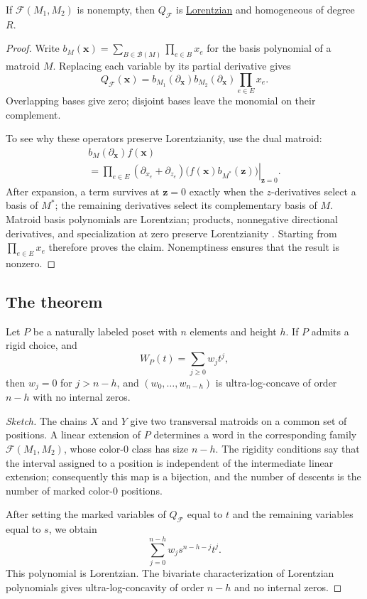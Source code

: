 \begin{proposition}
If $\mathcal F(M_1,M_2)$ is nonempty, then $Q_{\mathcal F}$ is
\href{rank.htm#lorentzianConjecture}{Lorentzian} and homogeneous of degree $R$.
\end{proposition}

\begin{proof}
Write $b_M(\mathbf x)=\sum_{B\in\mathcal B(M)}\prod_{e\in B}x_e$ for the
basis polynomial of a matroid $M$. Replacing each variable by its partial
derivative gives
\[
 Q_{\mathcal F}(\mathbf x)
 =b_{M_1}(\partial_{\mathbf x})b_{M_2}(\partial_{\mathbf x})
   \prod_{e\in E}x_e.
\]
Overlapping bases give zero; disjoint bases leave the monomial on their
complement.

To see why these operators preserve Lorentzianity, use the dual matroid:
\[
 \begin{gathered}
 b_M(\partial_{\mathbf x})f(\mathbf x)
 \\
 =\left.
 \prod_{e\in E}(\partial_{x_e}+\partial_{z_e})
 \bigl(f(\mathbf x)b_{M^*}(\mathbf z)\bigr)
 \right|_{\mathbf z=0}.
 \end{gathered}
\]
After expansion, a term survives at $\mathbf z=0$ exactly when the
$z$-derivatives select a basis of $M^*$; the remaining derivatives select
its complementary basis of $M$. Matroid basis polynomials are Lorentzian;
products, nonnegative directional derivatives, and specialization at zero
preserve Lorentzianity \cite{BrandenHuh2020}. Starting from $\prod_{e\in E}x_e$
therefore proves the claim. Nonemptiness ensures that the result is nonzero.
\end{proof}

\subsection[rigidWidthThreeTheorem]{The theorem}

\begin{theorem}
Let $P$ be a naturally labeled poset with $n$ elements and height $h$. If
$P$ admits a rigid choice, and
\[
 W_P(t)=\sum_{j\geq0}w_jt^j,
\]
then $w_j=0$ for $j>n-h$, and
$(w_0,\dotsc,w_{n-h})$ is ultra-log-concave of order $n-h$ with no internal
zeros.
\end{theorem}

\begin{proof}[Sketch]
The chains $X$ and $Y$ give two transversal matroids on a common set of
positions. A linear extension of $P$ determines a word in the corresponding
family $\mathcal F(M_1,M_2)$, whose color-$0$ class has size $n-h$. The
rigidity conditions say that the interval assigned to a position is independent
of the intermediate linear extension; consequently this map is a bijection,
and the number of descents is the number of marked color-$0$ positions.

After setting the marked variables of $Q_{\mathcal F}$ equal to $t$ and the
remaining variables equal to $s$, we obtain
\[
 \sum_{j=0}^{n-h}w_j s^{n-h-j}t^j.
\]
This polynomial is Lorentzian. The bivariate characterization of Lorentzian
polynomials gives ultra-log-concavity of order $n-h$ and no internal zeros.
\end{proof}
